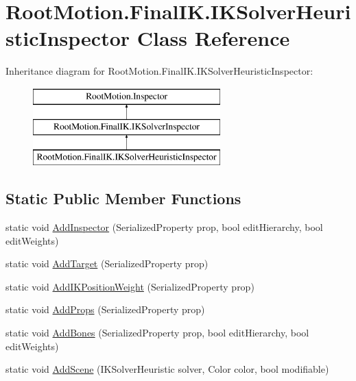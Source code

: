 \hypertarget{class_root_motion_1_1_final_i_k_1_1_i_k_solver_heuristic_inspector}{}\section{Root\+Motion.\+Final\+I\+K.\+I\+K\+Solver\+Heuristic\+Inspector Class Reference}
\label{class_root_motion_1_1_final_i_k_1_1_i_k_solver_heuristic_inspector}
Inheritance diagram for Root\+Motion.\+Final\+I\+K.\+I\+K\+Solver\+Heuristic\+Inspector\+:\begin{figure}[H]
\begin{center}
\leavevmode
\includegraphics[height=3.000000cm]{class_root_motion_1_1_final_i_k_1_1_i_k_solver_heuristic_inspector}
\end{center}
\end{figure}
\subsection*{Static Public Member Functions}
\begin{DoxyCompactItemize}
\item 
static void \mbox{\hyperlink{class_root_motion_1_1_final_i_k_1_1_i_k_solver_heuristic_inspector_a0087f985164eb407449da1d7665d8394}{Add\+Inspector}} (Serialized\+Property prop, bool edit\+Hierarchy, bool edit\+Weights)
\item 
static void \mbox{\hyperlink{class_root_motion_1_1_final_i_k_1_1_i_k_solver_heuristic_inspector_aabf5654553389cc8f75bb6ea1e559226}{Add\+Target}} (Serialized\+Property prop)
\item 
static void \mbox{\hyperlink{class_root_motion_1_1_final_i_k_1_1_i_k_solver_heuristic_inspector_a466748c9b8bffa7944efee98c4429bd8}{Add\+I\+K\+Position\+Weight}} (Serialized\+Property prop)
\item 
static void \mbox{\hyperlink{class_root_motion_1_1_final_i_k_1_1_i_k_solver_heuristic_inspector_a2a640103cdc08df3982abb97e622e039}{Add\+Props}} (Serialized\+Property prop)
\item 
static void \mbox{\hyperlink{class_root_motion_1_1_final_i_k_1_1_i_k_solver_heuristic_inspector_ad014eef72b4144267e580e826e4e6762}{Add\+Bones}} (Serialized\+Property prop, bool edit\+Hierarchy, bool edit\+Weights)
\item 
static void \mbox{\hyperlink{class_root_motion_1_1_final_i_k_1_1_i_k_solver_heuristic_inspector_a9733cbd8bcc24eb6ff5f24bb0580a8ae}{Add\+Scene}} (I\+K\+Solver\+Heuristic solver, Color color, bool modifiable)
\end{DoxyCompactItemize}
